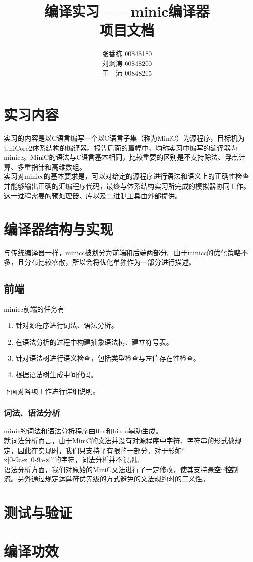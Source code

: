 \documentclass[12pt,a4paper,Flow]{report}
\begin{document}
\title{\textbf{编译实习——minic编译器\\项目文档}}
\author{张番栋 00848180\\刘澜涛 00848200\\王　沛 00848205}
\date{}
\maketitle
\tableofcontents
\newpage
\chapter{实习内容}
实习的内容是以C语言编写一个以C语言子集（称为MiniC）为源程序，目标机为UniCore2体系结构的编译器。报告后面的篇幅中，均称实习中编写的编译器为minicc。MiniC的语法与C语言基本相同，比较重要的区别是不支持除法、浮点计算、多重指针和高维数组。\\
\indent 实习对minicc的基本要求是，可以对给定的源程序进行语法和语义上的正确性检查并能够输出正确的汇编程序代码，最终与体系结构实习所完成的模拟器协同工作。这一过程需要的预处理器、库以及二进制工具由外部提供。
\chapter{编译器结构与实现}
与传统编译器一样，minicc被划分为前端和后端两部分。由于minicc的优化策略不多，且分布比较零散，所以会将优化单独作为一部分进行描述。
\section{前端}
minicc前端的任务有
\begin{enumerate}
\item 针对源程序进行词法、语法分析。
\item 在语法分析的过程中构建抽象语法树、建立符号表。
\item 针对语法树进行语义检查，包括类型检查与左值存在性检查。
\item 根据语法树生成中间代码。
\end{enumerate}
下面对各项工作进行详细说明。
\subsection{词法、语法分析}
minic的词法和语法分析程序由flex和bison辅助生成。\\
\indent 就词法分析而言，由于MiniC的文法并没有对源程序中字符、字符串的形式做规定，因此在实现时，我们只支持了有限的一部分。对于形如“\\x[0-9a-z][0-9a-z]”的字符，词法分析并不识别。\\
\indent 语法分析方面，我们对原始的MiniC文法进行了一定修改，使其支持悬空if控制流。另外通过规定运算符优先级的方式避免的文法规约时的二义性。
\chapter{测试与验证}
\chapter{编译功效}
\end{document}
